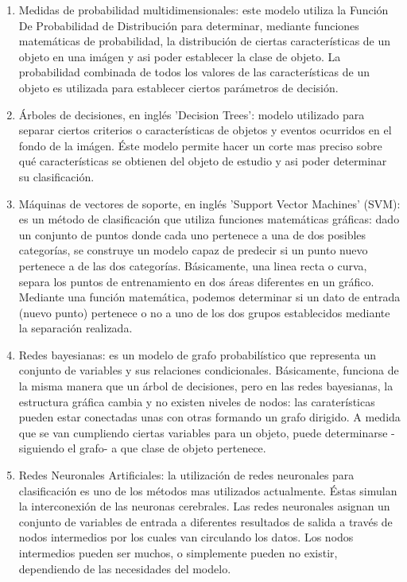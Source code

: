 \documentclass[a4paper,12pt,twoside]{article}
\begin{document}
\begin{enumerate}
	\baselineskip 0pt
	\item Medidas de probabilidad multidimensionales: este modelo utiliza la Función De Probabilidad de Distribución para determinar, mediante funciones matemáticas de probabilidad, la distribución de ciertas características de un objeto en una imágen y asi poder establecer la clase de objeto. La probabilidad combinada de todos los valores de las características de un objeto es utilizada para establecer ciertos parámetros de decisión.\\
	\item Árboles de decisiones, en inglés 'Decision Trees': modelo utilizado para separar ciertos criterios o características de objetos y eventos ocurridos en el fondo de la imágen. Éste modelo permite hacer un corte mas preciso sobre qué características se obtienen del objeto de estudio y asi poder determinar su clasificación.\\
	\item Máquinas de vectores de soporte, en inglés 'Support Vector Machines' (SVM): es un método de clasificación que utiliza funciones matemáticas gráficas: dado un conjunto de puntos donde cada uno pertenece a una de dos posibles categorías, se construye un modelo capaz de predecir si un punto nuevo pertenece a de las dos categorías. Básicamente, una linea recta o curva, separa los puntos de entrenamiento en dos áreas diferentes en un gráfico. Mediante una función matemática, podemos determinar si un dato de entrada (nuevo punto) pertenece o no a uno de los dos grupos establecidos mediante la separación realizada.\\
	\item Redes bayesianas: es un modelo de grafo probabilístico que representa un conjunto de variables y sus relaciones condicionales. Básicamente, funciona de la misma manera que un árbol de decisiones, pero en las redes bayesianas, la estructura gráfica cambia y no existen niveles de nodos: las caraterísticas pueden estar conectadas unas con otras formando un grafo dirigido. A medida que se van cumpliendo ciertas variables para un objeto, puede determinarse -siguiendo el grafo- a que clase de objeto pertenece.\\
	\item Redes Neuronales Artificiales: la utilización de redes neuronales para clasificación es uno de los métodos mas utilizados actualmente. Éstas simulan la interconexión de las neuronas cerebrales. Las redes neuronales asignan un conjunto de variables de entrada a diferentes resultados de salida a través de nodos intermedios por los cuales van circulando los datos. Los nodos intermedios pueden ser muchos, o simplemente pueden no existir, dependiendo de las necesidades del modelo.\\
\end{enumerate}	\baselineskip 14pt	
	
\end{document}
